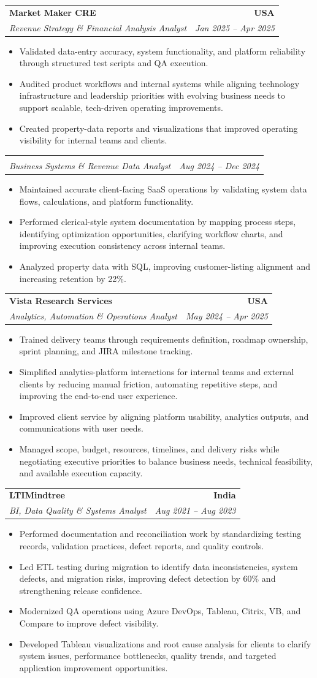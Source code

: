 \documentclass[letterpaper,10pt]{article}
\makeatletter
\newcommand{\resumeItem}[1]{\item \small{#1}}
\newcommand{\resumeSubheading}[4]{
  \vspace{1pt}\item
    \begin{tabular*}{1.0\textwidth}[t]{l@{\extracolsep{\fill}}r}
      \textbf{#1} & \textbf{\small #2} \\
      \textit{\small #3} & \textit{\small #4} \\
    \end{tabular*}\vspace{-6pt}
}
\newcommand{\resumeItemListStart}{\begin{itemize}[leftmargin=0.15in, itemsep=1pt, topsep=3pt]}
\newcommand{\resumeItemListEnd}{\end{itemize}\vspace{-2pt}}
\makeatother
\begin{document}
\vspace{-2pt}

\resumeSubheading
{Market Maker CRE}{USA}
{Revenue Strategy \& Financial Analysis Analyst}{Jan 2025 -- Apr 2025}
\resumeItemListStart
\resumeItem{Validated data-entry accuracy, system functionality, and platform reliability through structured test scripts and QA execution.}
\resumeItem{Audited product workflows and internal systems while aligning technology infrastructure and leadership priorities with evolving business needs to support scalable, tech-driven operating improvements.}
\resumeItem{Created property-data reports and visualizations that improved operating visibility for internal teams and clients.}
\resumeItemListEnd

\vspace{-12pt}

\resumeSubheading
{}{}
{Business Systems \& Revenue Data Analyst}{Aug 2024 -- Dec 2024}
\resumeItemListStart
\resumeItem{Maintained accurate client-facing SaaS operations by validating system data flows, calculations, and platform functionality.}
\resumeItem{Performed clerical-style system documentation by mapping process steps, identifying optimization opportunities, clarifying workflow charts, and improving execution consistency across internal teams.}
\resumeItem{Analyzed property data with SQL, improving customer-listing alignment and increasing retention by 22\%.}
\resumeItemListEnd

\vspace{-2pt}

\resumeSubheading
{Vista Research Services}{USA}
{Analytics, Automation \& Operations Analyst}{May 2024 -- Apr 2025}
\resumeItemListStart
\resumeItem{Trained delivery teams through requirements definition, roadmap ownership, sprint planning, and JIRA milestone tracking.}
\resumeItem{Simplified analytics-platform interactions for internal teams and external clients by reducing manual friction, automating repetitive steps, and improving the end-to-end user experience.}
\resumeItem{Improved client service by aligning platform usability, analytics outputs, and communications with user needs.}
\resumeItem{Managed scope, budget, resources, timelines, and delivery risks while negotiating executive priorities to balance business needs, technical feasibility, and available execution capacity.}
\resumeItemListEnd

\vspace{-2pt}

\resumeSubheading
{LTIMindtree}{India}
{BI, Data Quality \& Systems Analyst}{Aug 2021 -- Aug 2023}
\resumeItemListStart
\resumeItem{Performed documentation and reconciliation work by standardizing testing records, validation practices, defect reports, and quality controls.}
\resumeItem{Led ETL testing during migration to identify data inconsistencies, system defects, and migration risks, improving defect detection by 60\% and strengthening release confidence.}
\resumeItem{Modernized QA operations using Azure DevOps, Tableau, Citrix, VB, and Compare to improve defect visibility.}
\resumeItem{Developed Tableau visualizations and root cause analysis for clients to clarify system issues, performance bottlenecks, quality trends, and targeted application improvement opportunities.}
\resumeItemListEnd
\end{document}
